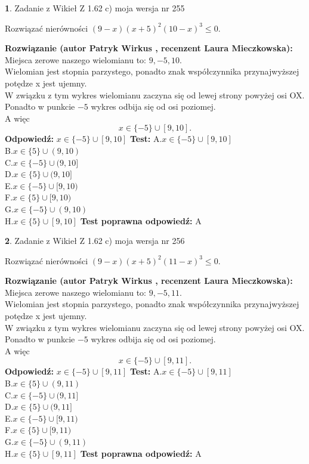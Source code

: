 \documentclass[12pt, a4paper]{article}
\theoremstyle{definition} %
\newtheorem{zad}{}
\newcommand{\zadStart}[1]{\begin{zad}#1\newline}
\newcommand{\zadStop}{\end{zad}}
\newcommand{\rozwStart}[2]{\noindent \textbf{Rozwiązanie (autor #1 , recenzent #2): }\newline}
\newcommand{\rozwStop}{\newline}
\newcommand{\odpStart}{\noindent \textbf{Odpowiedź:}\newline}
\newcommand{\odpStop}{\newline}
\newcommand{\testStart}{\noindent \textbf{Test:}\newline}
\newcommand{\testStop}{\newline}
\newcommand{\kluczStart}{\noindent \textbf{Test poprawna odpowiedź:}\newline}
\newcommand{\kluczStop}{\newline}
\begin{document}
\zadStart{Zadanie z Wikieł Z 1.62 c) moja wersja nr 255}

Rozwiązać nierówności $(9-x)(x+5)^{2}(10-x)^{3}\le0$.
\zadStop
\rozwStart{Patryk Wirkus}{Laura Mieczkowska}
Miejsca zerowe naszego wielomianu to: $9, -5, 10$.\\
Wielomian jest stopnia parzystego, ponadto znak współczynnika przy\linebreak najwyższej potędze x jest ujemny.\\ W związku z tym wykres wielomianu zaczyna się od lewej strony powyżej osi OX.\\
Ponadto w punkcie $-5$ wykres odbija się od osi poziomej.\\
A więc $$x \in \{-5\} \cup [9,10].$$
\rozwStop
\odpStart
$x \in \{-5\} \cup [9,10]$
\odpStop
\testStart
A.$x \in \{-5\} \cup [9,10]$\\
B.$x \in \{5\} \cup (9,10)$\\
C.$x \in \{-5\} \cup (9,10]$\\
D.$x \in \{5\} \cup (9,10]$\\
E.$x \in \{-5\} \cup [9,10)$\\
F.$x \in \{5\} \cup [9,10)$\\
G.$x \in \{-5\} \cup (9,10)$\\
H.$x \in \{5\} \cup [9,10]$
\testStop
\kluczStart
A
\kluczStop



\zadStart{Zadanie z Wikieł Z 1.62 c) moja wersja nr 256}

Rozwiązać nierówności $(9-x)(x+5)^{2}(11-x)^{3}\le0$.
\zadStop
\rozwStart{Patryk Wirkus}{Laura Mieczkowska}
Miejsca zerowe naszego wielomianu to: $9, -5, 11$.\\
Wielomian jest stopnia parzystego, ponadto znak współczynnika przy\linebreak najwyższej potędze x jest ujemny.\\ W związku z tym wykres wielomianu zaczyna się od lewej strony powyżej osi OX.\\
Ponadto w punkcie $-5$ wykres odbija się od osi poziomej.\\
A więc $$x \in \{-5\} \cup [9,11].$$
\rozwStop
\odpStart
$x \in \{-5\} \cup [9,11]$
\odpStop
\testStart
A.$x \in \{-5\} \cup [9,11]$\\
B.$x \in \{5\} \cup (9,11)$\\
C.$x \in \{-5\} \cup (9,11]$\\
D.$x \in \{5\} \cup (9,11]$\\
E.$x \in \{-5\} \cup [9,11)$\\
F.$x \in \{5\} \cup [9,11)$\\
G.$x \in \{-5\} \cup (9,11)$\\
H.$x \in \{5\} \cup [9,11]$
\testStop
\kluczStart
A
\kluczStop
\end{document}
